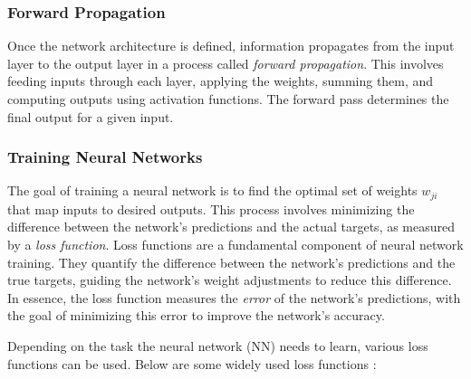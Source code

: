 \subsubsection*{Forward Propagation}
Once the network architecture is defined, information propagates from the input layer to the output layer in a process called \textit{forward propagation}. This involves feeding inputs through each layer, applying the weights, summing them, and computing outputs using activation functions. The forward pass determines the final output for a given input.

\subsubsection*{Training Neural Networks}
The goal of training a neural network is to find the optimal set of weights $w_{ji}$ that map inputs to desired outputs. This process involves minimizing the difference between the network’s predictions and the actual targets, as measured by a \textit{loss function}.
Loss functions are a fundamental component of neural network training. They quantify the difference between the network's predictions and the true targets, guiding the network’s weight adjustments to reduce this difference. In essence, the loss function measures the \textit{error} of the network's predictions, with the goal of minimizing this error to improve the network's accuracy.

Depending on the task the neural network (NN) needs to learn, various loss functions can be used. Below are some widely used loss functions \cite{LF_review}:

